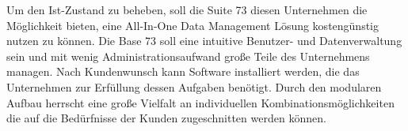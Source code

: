 	Um den Ist-Zustand zu beheben, soll die Suite 73 diesen Unternehmen die Möglichkeit bieten, eine All-In-One Data Management Lösung kostengünstig nutzen zu können.
	Die Base 73 soll eine intuitive Benutzer- und Datenverwaltung sein und mit wenig Administrationsaufwand große Teile des Unternehmens managen.
	Nach Kundenwunsch kann Software installiert werden, die das Unternehmen zur Erfüllung dessen Aufgaben benötigt. Durch den modularen Aufbau herrscht eine große Vielfalt an individuellen Kombinationsmöglichkeiten die auf die Bedürfnisse der Kunden zugeschnitten werden können.
	